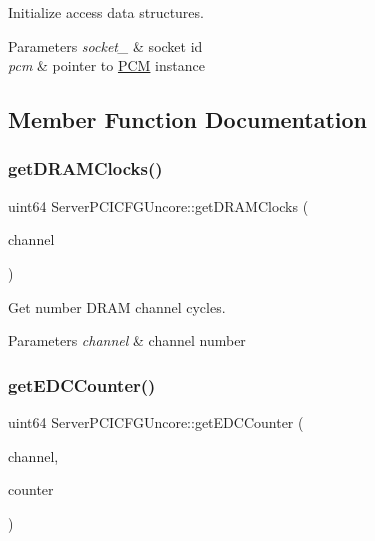 Initialize access data structures. 


\begin{DoxyParams}{Parameters}
{\em socket\+\_\+} & socket id \\
\hline
{\em pcm} & pointer to \mbox{\hyperlink{class_p_c_m}{P\+CM}} instance \\
\hline
\end{DoxyParams}


\subsection{Member Function Documentation}
\mbox{\label{class_server_p_c_i_c_f_g_uncore_a3b218ad26a3c6411754ed177427b2a80}} 
\subsubsection{\texorpdfstring{get\+D\+R\+A\+M\+Clocks()}{getDRAMClocks()}}
{\footnotesize\ttfamily uint64 Server\+P\+C\+I\+C\+F\+G\+Uncore\+::get\+D\+R\+A\+M\+Clocks (\begin{DoxyParamCaption}\item[{uint32}]{channel }\end{DoxyParamCaption})}



Get number D\+R\+AM channel cycles. 


\begin{DoxyParams}{Parameters}
{\em channel} & channel number \\
\hline
\end{DoxyParams}
\mbox{\label{class_server_p_c_i_c_f_g_uncore_aa48e2113a37b0727b1dbe27c391ccd04}} 
\subsubsection{\texorpdfstring{get\+E\+D\+C\+Counter()}{getEDCCounter()}}
{\footnotesize\ttfamily uint64 Server\+P\+C\+I\+C\+F\+G\+Uncore\+::get\+E\+D\+C\+Counter (\begin{DoxyParamCaption}\item[{uint32}]{channel,  }\item[{uint32}]{counter }\end{DoxyParamCaption})}



